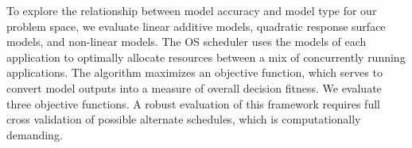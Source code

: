 To explore the relationship between model accuracy and model type
for our problem space, we evaluate linear additive models, quadratic
response surface models, and non-linear models.
The OS scheduler uses the models of each application to
optimally allocate resources between a mix of concurrently running applications. The algorithm maximizes an objective function,
which serves to convert model outputs into a measure of overall
decision fitness.
We evaluate three objective functions. A robust evaluation of this framework
requires full cross validation of possible alternate schedules,
which is computationally demanding.



